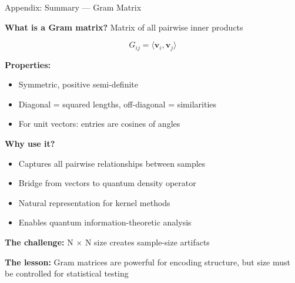 \documentclass[aspectratio=169,11pt]{beamer}
\begin{document}
\begin{frame}{Appendix: Summary — Gram Matrix}

\textbf{What is a Gram matrix?} Matrix of all pairwise inner products

$$G_{ij} = \langle \mathbf{v}_i, \mathbf{v}_j \rangle$$

\vspace{0.5em}

\textbf{Properties:}
\begin{itemize}
  \item Symmetric, positive semi-definite
  \item Diagonal = squared lengths, off-diagonal = similarities
  \item For unit vectors: entries are cosines of angles
\end{itemize}

\vspace{0.5em}

\textbf{Why use it?}
\begin{itemize}
  \item Captures all pairwise relationships between samples
  \item Bridge from vectors to quantum density operator
  \item Natural representation for kernel methods
  \item Enables quantum information-theoretic analysis
\end{itemize}

\vspace{0.5em}

\textbf{The challenge:} N $\times$ N size creates sample-size artifacts

\vspace{0.3em}

\textbf{The lesson:} Gram matrices are powerful for encoding structure, but size must be controlled for statistical testing

\end{frame}
\end{document}
